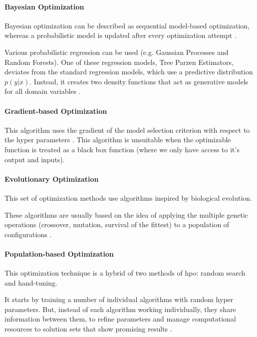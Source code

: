 \paragraph{Bayesian Optimization}

Bayesian optimization can be described as sequential model-based optimization, whereas a probabilistic model is updated after every optimization attempt \parencite{dewancker}.

Various probabilistic regression can be used (e.g. Gaussian Processes and Random Forests). One of these regression models, Tree Parzen Estimators, deviates from the standard regression models, which use a predictive distribution $p(y|x)$. Instead, it creates two density functions that act as generative models for all domain variables \parencite{NIPS2011_86e8f7ab}\parencite{elshawi2019automated}.

\paragraph{Gradient-based Optimization}

This algorithm uses the gradient of the model selection criterion with respect to the hyper parameters \parencite{bengio2000}. This algorithm is unsuitable when the optimizable function is treated as a black box function (where we only have access to  it's output and inputs).


\paragraph{Evolutionary Optimization}

This set of optimization methods use algorithms inspired by biological evolution.

These algorithms are usually based on the idea of applying the multiple genetic operations (crossover, mutation, survival of the fittest) to a population of configurations \parencite{elshawi2019automated}.

\paragraph{Population-based Optimization}

This optimization technique is a hybrid of two methods of \acrshort{hpo}: random search and hand-tuning.

It starts by training a number of individual algorithms with random hyper parameters. But, instead of each algorithm working individually, they share information between them, to refine parameters and manage computational resources to solution sets that show promising results \parencite{jaderberg2017population}.

